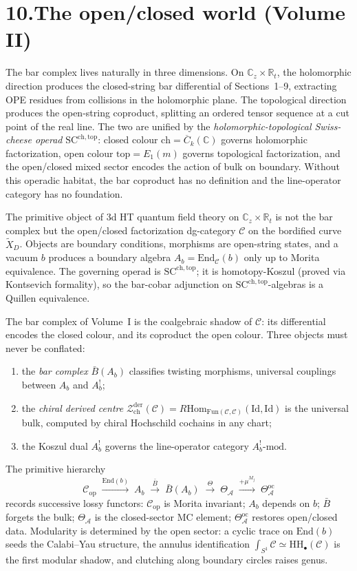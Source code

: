 \documentclass[11pt,reqno]{amsart}
\theoremstyle{definition}
\theoremstyle{remark}
\providecommand{\cA}{\mathcal{A}}
\providecommand{\cC}{\mathcal{C}}
\providecommand{\cZ}{\mathcal{Z}}
\providecommand{\barB}{\bar{B}}
\providecommand{\Hom}{\mathrm{Hom}}
\providecommand{\FM}{\overline{C}}
\providecommand{\bC}{\mathbb{C}}
\providecommand{\bR}{\mathbb{R}}
\providecommand{\SCchtop}{\mathrm{SC}^{\mathrm{ch,top}}}
\providecommand{\HH}{\mathrm{HH}}
\providecommand{\Fun}{\mathrm{Fun}}
\providecommand{\End}{\mathrm{End}}
\providecommand{\der}{\mathrm{der}}
\providecommand{\ch}{\mathrm{ch}}
\providecommand{\op}{\mathrm{op}}
\providecommand{\oc}{\mathrm{oc}}
\providecommand{\Id}{\mathrm{Id}}
\numberwithin{equation}{section}
\begin{document}
\section*{10.\quad The open/closed world (Volume II)}

The bar complex lives naturally in three dimensions. On
$\bC_z \times \bR_t$, the holomorphic direction produces the
closed-string bar differential of Sections~1--9, extracting OPE
residues from collisions in the holomorphic plane. The
topological direction produces the open-string coproduct,
splitting an ordered tensor sequence at a cut point of the real
line. The two are unified by the \emph{holomorphic-topological
Swiss-cheese operad} $\SCchtop$: closed colour
$\mathrm{ch} = \FM_k(\bC)$ governs holomorphic factorization,
open colour $\mathrm{top} = E_1(m)$ governs topological
factorization, and the open/closed mixed sector encodes the
action of bulk on boundary. Without this operadic habitat, the
bar coproduct has no definition and the line-operator category
has no foundation.

The primitive object of 3d HT quantum field theory on
$\bC_z \times \bR_t$ is not the bar complex but the open/closed
factorization dg-category $\cC$ on the bordified curve
$\widetilde X_D$. Objects are boundary conditions, morphisms
are open-string states, and a vacuum $b$ produces a boundary
algebra $A_b = \End_\cC(b)$ only up to Morita equivalence. The
governing operad is $\SCchtop$; it is homotopy-Koszul (proved
via Kontsevich formality), so the bar-cobar adjunction on
$\SCchtop$-algebras is a Quillen equivalence.

The bar complex of Volume~I is the coalgebraic shadow of $\cC$:
its differential encodes the closed colour, and its coproduct
the open colour. Three objects must never be conflated:
\begin{enumerate}[label=\textup{(\roman*)},nosep]
\item the \emph{bar complex} $\barB(A_b)$ classifies twisting
morphisms, universal couplings between $A_b$ and $A_b^!$;
\item the \emph{chiral derived centre}
$\cZ^{\der}_{\ch}(\cC) =
R\Hom_{\Fun(\cC,\cC)}(\Id, \Id)$ is the universal bulk,
computed by chiral Hochschild cochains in any chart;
\item the Koszul dual $A_b^!$ governs the line-operator
category $A_b^!\text{-mod}$.
\end{enumerate}
The primitive hierarchy
\[
\cC_{\op}
\;\xrightarrow{\End(b)}\;
A_b
\;\xrightarrow{\barB}\;
\barB(A_b)
\;\xrightarrow{\Theta}\;
\Theta_\cA
\;\xrightarrow{+\mu^{M_j}}\;
\Theta^{\oc}_\cA
\]
records successive lossy functors: $\cC_{\op}$ is Morita
invariant; $A_b$ depends on $b$; $\barB$ forgets the bulk;
$\Theta_\cA$ is the closed-sector MC element;
$\Theta^{\oc}_\cA$ restores open/closed data. Modularity is
determined by the open sector: a cyclic trace on $\End(b)$
seeds the Calabi--Yau structure, the annulus identification
$\int_{S^1} \cC \simeq \HH_\bullet(\cC)$ is the first modular
shadow, and clutching along boundary circles raises genus.
\end{document}
